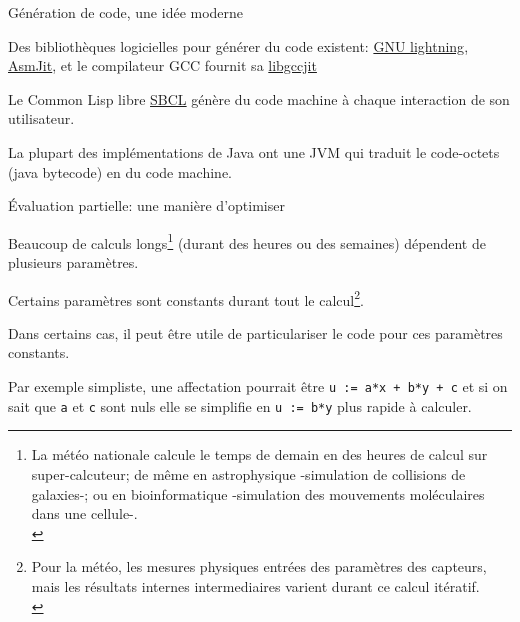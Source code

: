 \documentclass[final,a4,xcolor={svgnames,dvipsnames}]{beamer}
\begin{document}
 \begin{frame}{Génération de code, une idée moderne}

  Des bibliothèques logicielles pour générer du code existent:
  \href{https://www.gnu.org/software/lightning/}{GNU lightning},
  \href{https://asmjit.com/}{AsmJit}, et le compilateur GCC fournit sa
  \href{https://gcc.gnu.org/onlinedocs/jit/}{libgccjit}

  \bigskip
  
  Le Common Lisp libre \href{https://sbcl.org/}{SBCL} génère du code
  machine à chaque interaction de son utilisateur.

  \bigskip
  
  La plupart des implémentations de Java ont une JVM qui traduit le code-octets (java bytecode) en du code machine.

 \end{frame}

 \begin{frame}{Évaluation partielle: une manière d'optimiser}

Beaucoup de calculs longs\footnote{La météo nationale calcule le temps
de demain en des heures de calcul sur super-calcuteur; de même en
astrophysique -simulation de collisions de galaxies-; ou en
bioinformatique -simulation des mouvements moléculaires dans une
cellule-.\\} (durant des heures ou des semaines) dépendent de plusieurs
paramètres.
\medskip

Certains paramètres sont constants durant tout le calcul\footnote{Pour
la météo, les mesures physiques entrées des paramètres des capteurs,
mais les résultats internes intermediaires varient durant ce calcul
itératif.\\}.
\medskip

Dans certains cas, il peut être utile de particulariser le code pour ces paramètres constants.

Par exemple simpliste, une affectation pourrait être \texttt{u := a*x
  + b*y + c} et si on sait que \texttt{a} et \texttt{c} sont nuls elle
se simplifie en \texttt{u := b*y} plus rapide à calculer.


 \end{frame}
\end{document}
